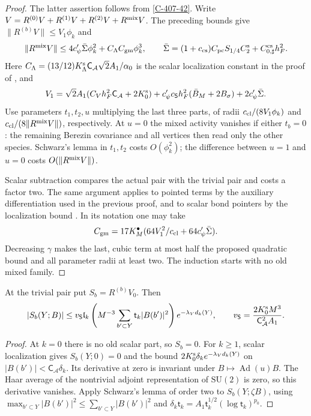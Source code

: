 \documentclass[11pt,letterpaper,reqno]{amsart}
\makeatletter
\theoremstyle{definition}
\newcommand{\ms@minorstart}{%
  \pushQED{\qed}\renewcommand{\qedsymbol}{$\blacksquare$}}
\newenvironment{lemma}[1][]{\ms@minorstart\ms@lemma[#1]}
  {\popQED\endms@lemma}
\theoremstyle{remark}
\makeatother
\begin{document}
\begin{proof}
The latter assertion follows from \cref{C-407-42}.  Write
$V=R^{(0)}V+R^{(1)}V+R^{(2)}V+R^{\rm mix}V$.
The preceding bounds give $\|R^{(b)}V\|\le V_1\phi_k$ and
\[
 \|R^{\rm mix}V\|
 \le4c'_\psi\bar\Sigma\phi_k^2+C_\Lambda C_{\rm gm}\phi_k^3,
 \qquad
 \bar\Sigma=(1+c_{\rm cs})C_{\rm pc}S_{1/4}C_2^{\rm s}
                 +C_{0,\sharp}^{\rm cs}h_F^2.
\]
Here $C_\Lambda=(13/12)K_\Lambda^{\rm s}
\mathsf C_{\mathcal A}\sqrt2A_1/\alpha_0$ is the scalar
localization constant in the proof of
\cite[Prop. 10.1]{QCDM1}, and
\[
 V_1=\sqrt2A_1(C_Vh_F^2\mathsf C_{\mathcal A}+2K_0^{\rm s})
       +c'_\psi c_{\mathsf S}h_F^2(\bar B_M+2B_\sigma)
       +2c'_\psi\bar\Sigma.
\]
Use parameters $t_1,t_2,u$ multiplying the last three parts,
of radii $c_{\rm cl}/(8V_1\phi_k)$ and
$c_{\rm cl}/(8\|R^{\rm mix}V\|)$, respectively.
At $u=0$ the mixed activity vanishes if either $t_b=0$:
the remaining Berezin covariance and all vertices then read
only the other species.  Schwarz's lemma in $t_1,t_2$ costs
$O(\phi_k^2)$; the difference between $u=1$ and $u=0$ costs
$O(\|R^{\rm mix}V\|)$.

Scalar subtraction compares the actual pair with the trivial
pair and costs a factor two.  The same argument applies to
pointed terms by the auxiliary differentiation used in the
previous proof, and to scalar bond pointers by the localization
bound \cite[Lem. 7.4]{QCDM1}.  In its notation one may take
\[
 C_{\rm gm}=17K_M^\bullet
       (64V_1^2/c_{\rm cl}+64c'_\psi\bar\Sigma).
\]
Decreasing $\gamma$ makes the last, cubic term at most half
the proposed quadratic bound and all parameter radii at least
two.  The induction starts with no old mixed family.
\end{proof}

\begin{lemma}\label{C-415-8}
At the trivial pair put $S_b=R^{(b)}V_0$.  Then
\begin{equation}\label{eq:qcdm2-scalar-quadratic}
 |S_b(Y;B)|\le v_{\mathsf S}\mathfrak l_k
       \left(M^{-3}\sum_{b'\subset Y}\mathsf t_k|B(b')|^2\right)
           e^{-\lambda_Vd_k(Y)},
 \qquad
 v_{\mathsf S}=\frac{2K_0^{\rm s}M^3}
                    {\mathsf C_{\mathcal A}^2A_1}.
\end{equation}
\end{lemma}

\begin{proof}
At $k=0$ there is no old scalar part, so $S_b=0$.
For $k\ge1$, scalar localization gives $S_b(Y;0)=0$ and the bound
$2K_0^{\rm s}\delta_ke^{-\lambda_Vd_k(Y)}$ on
$|B(b')|<\mathsf C_{\mathcal A}\delta_k$.  Its derivative at
zero is invariant under $B\mapsto\operatorname{Ad}(u)B$.
The Haar average of the nontrivial adjoint representation of
$\mathrm{SU}(2)$ is zero, so this derivative vanishes.
Apply Schwarz's lemma of order two to $S_b(Y;\zeta B)$,
using $\max_{b'\subset Y}|B(b')|^2
\le\sum_{b'\subset Y}|B(b')|^2$ and
$\delta_k\mathsf t_k=A_1\mathsf t_k^{1/2}
(\log\mathsf t_k)^{p_0}$.
\end{proof}
\end{document}
